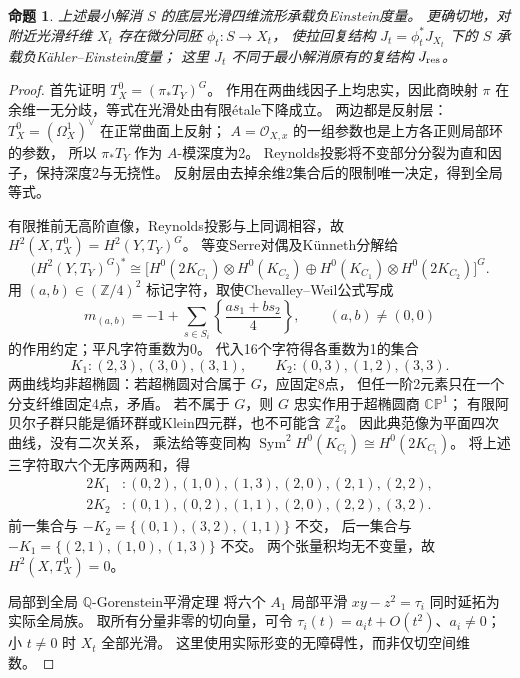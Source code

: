 \documentclass[UTF8,a4paper,11pt,fontset=fandol]{ctexart}
\numberwithin{equation}{section}
\newtheorem{proposition}[theorem]{命题}
\theoremstyle{definition}
\newcommand{\CP}{\mathbb{CP}}
\newcommand{\Z}{\mathbb Z}
\begin{document}
\begin{proposition}\label{prop:bcgp-smooth-einstein}
上述最小解消 $S$ 的底层光滑四维流形承载负Einstein度量。
更确切地，对附近光滑纤维 $X_t$ 存在微分同胚 $\phi_t:S\to X_t$，
使拉回复结构 $J_t=\phi_t^*J_{X_t}$ 下的 $S$ 承载负K\"ahler--Einstein度量；
这里 $J_t$ 不同于最小解消原有的复结构 $J_{\rm res}$。
\end{proposition}
\begin{proof}
首先证明 $T_X^0=(\pi_*T_Y)^G$。
作用在两曲线因子上均忠实，因此商映射 $\pi$ 在余维一无分歧，等式在光滑处由有限\'etale下降成立。
两边都是反射层：$T_X^0=(\Omega_X^1)^\vee$ 在正常曲面上反射；
$A=\mathcal O_{X,x}$ 的一组参数也是上方各正则局部环的参数，
所以 $\pi_*T_Y$ 作为 $A$-模深度为2。
Reynolds投影将不变部分分裂为直和因子，保持深度2与无挠性。
反射层由去掉余维2集合后的限制唯一决定，得到全局等式。

有限推前无高阶直像，Reynolds投影与上同调相容，故
$H^2(X,T_X^0)=H^2(Y,T_Y)^G$。
等变Serre对偶及K\"unneth分解给
\[
\bigl(H^2(Y,T_Y)^G\bigr)^*\cong
\bigl[H^0(2K_{C_1})\otimes H^0(K_{C_2})
\oplus H^0(K_{C_1})\otimes H^0(2K_{C_2})\bigr]^G.
\]
用 $(a,b)\in(\Z/4)^2$ 标记字符，取使Chevalley--Weil公式写成
\[
m_{(a,b)}=-1+\sum_{s\in S_i}
\left\{\frac{a s_1+b s_2}{4}\right\},\qquad (a,b)\ne(0,0)
\]
的作用约定；平凡字符重数为0。
代入16个字符得各重数为1的集合
\[
K_1:(2,3),(3,0),(3,1),\qquad
K_2:(0,3),(1,2),(3,3).
\]
两曲线均非超椭圆：若超椭圆对合属于 $G$，应固定8点，
但任一阶2元素只在一个分支纤维固定4点，矛盾。
若不属于 $G$，则 $G$ 忠实作用于超椭圆商 $\CP^1$；
有限阿贝尔子群只能是循环群或Klein四元群，也不可能含 $\Z_4^2$。
因此典范像为平面四次曲线，没有二次关系，
乘法给等变同构 $\operatorname{Sym}^2H^0(K_{C_i})\cong H^0(2K_{C_i})$。
将上述三字符取六个无序两两和，得
\begin{align*}
2K_1&:(0,2),(1,0),(1,3),(2,0),(2,1),(2,2),\\
2K_2&:(0,1),(0,2),(1,1),(2,0),(2,2),(3,2).
\end{align*}
前一集合与 $-K_2=\{(0,1),(3,2),(1,1)\}$ 不交，
后一集合与 $-K_1=\{(2,1),(1,0),(1,3)\}$ 不交。
两个张量积均无不变量，故 $H^2(X,T_X^0)=0$。

局部到全局 $\mathbb Q$-Gorenstein平滑定理
\cite[Proposition 2.4(2)]{LeePark}
将六个 $A_1$ 局部平滑 $xy-z^2=\tau_i$ 同时延拓为实际全局族。
取所有分量非零的切向量，可令
$\tau_i(t)=a_it+O(t^2)$、$a_i\ne0$；小 $t\ne0$ 时 $X_t$ 全部光滑。
这里使用实际形变的无障碍性，而非仅切空间维数。


\end{proof}
\end{document}
